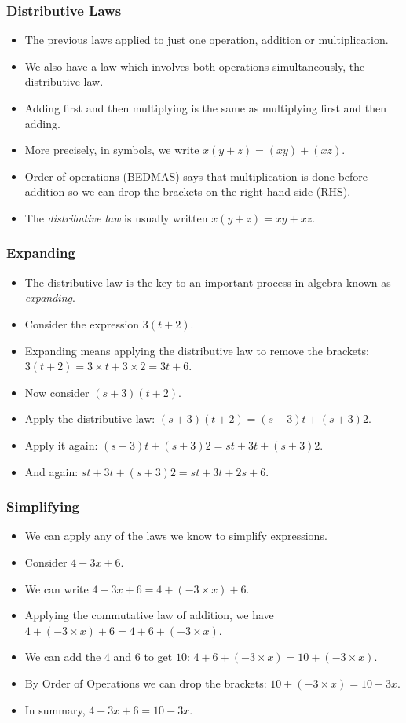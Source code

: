 \documentclass[serif,ignorenonframetext]{beamer}
\begin{document}
\begin{frame}
  \frametitle{Distributive Laws}
  \begin{itemize}[<+->]
  \item The previous laws applied to just one operation, addition or
    multiplication. 
  \item We also have a law which involves both operations
    simultaneously, the distributive law.
  \item Adding first and then multiplying is the same as multiplying
    first and then adding.
  \item More precisely, in symbols, we write \(x(y+z) = (xy) + (xz)\).
  \item Order of operations (BEDMAS) says that multiplication is done
    before addition so we can drop the brackets on the right hand side
    (RHS).
  \item The \textit{distributive law} is usually written
    \(x(y+z) = xy+xz\).
  \end{itemize}
\end{frame}

\begin{frame}
  \frametitle{Expanding}
  \begin{itemize}[<+->]
  \item The distributive law is the key to an important process in
    algebra known as \textit{expanding}.
  \item Consider the expression $3(t+2)$.
  \item Expanding means applying the distributive law to remove the
    brackets: $3(t+2) = 3\times t + 3\times 2 = 3t+6$.
  \item Now consider $(s+3)(t+2)$.
  \item Apply the distributive law: $(s+3)(t+2)=(s+3)t+(s+3)2$.
  \item Apply it again: $(s+3)t + (s+3)2 = st+3t+(s+3)2$.
  \item And again: $st+3t+(s+3)2=st+3t+2s+6$.
  \end{itemize}
\end{frame}

\begin{frame}
  \frametitle{Simplifying}
  \begin{itemize}[<+->]
  \item We can apply any of the laws we know to simplify expressions.
  \item Consider $4-3x+6$.
  \item We can write $4-3x+6 = 4 + (-3\times x) + 6$.
  \item Applying the commutative law of addition, we have
    $4+(-3\times x) + 6 = 4 + 6 + (-3\times x)$.
  \item We can add the $4$ and $6$ to get $10$: $4+6+(-3\times
    x)=10+(-3\times x)$.
  \item By Order of Operations we can drop the brackets: $10+(-3\times
    x) = 10-3x$.
  \item In summary, $4-3x+6=10-3x$.
  \end{itemize}
\end{frame}
\end{document}
